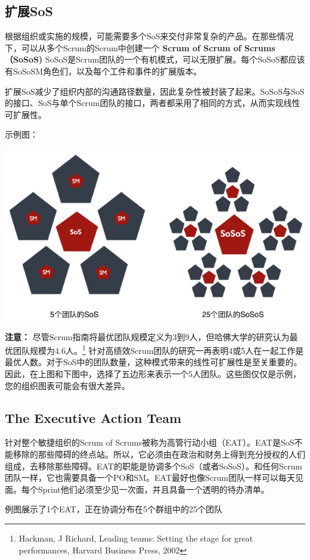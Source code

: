 \documentclass[12pt,a4paper,parskip=full]{scrartcl}
\begin{document}
\begin{CJK*}{UTF8}{gbsn}
\subsection{扩展SoS}
根据组织或实施的规模，可能需要多个SoS来交付非常复杂的产品。在那些情况下，可以从多个Scrum的Scrum中创建一个
\textbf{Scrum of Scrum of Scrums（SoSoS)} SoSoS是Scrum团队的一个有机模式，可以无限扩展。每个SoSoS都应该有SoSoSM角色们，以及每个工件和事件的扩展版本。

扩展SoS减少了组织内部的沟通路径数量，因此复杂性被封装了起来。SoSoS与SoS的接口、SoS与单个Scrum团队的接口，两者都采用了相同的方式，从而实现线性可扩展性。

\pagebreak
示例图：

\includegraphics[width=1.0\linewidth]{Sos-R2.png}

\textbf{\textsc{注意：}} 尽管Scrum指南将最优团队规模定义为3到9人，但哈佛大学的研究认为最优团队规模为4.6人。\footnote{Hackman, J Richard, Leading teams: Setting the stage for
great performances, Harvard Business Press, 2002} 针对高绩效Scrum团队的研究一再表明4或5人在一起工作是最优人数。对于SoS中的团队数量，这种模式带来的线性可扩展性是至关重要的。因此，在上图和下图中，选择了五边形来表示一个5人团队。这些图仅仅是示例，您的组织图表可能会有很大差异。
\subsection{The Executive Action Team}
针对整个敏捷组织的Scrum of Scrums被称为高管行动小组（EAT）。EAT是SoS不能移除的那些障碍的终点站。所以，它必须由在政治和财务上得到充分授权的人们组成，去移除那些障碍。EAT的职能是协调多个SoS（或者SoSoS）。和任何Scrum团队一样，它也需要具备一个PO和SM。EAT最好也像Scrum团队一样可以每天见面。每个Sprint他们必须至少见一次面，并且具备一个透明的待办清单。

\pagebreak
例图展示了1个EAT，正在协调分布在5个群组中的25个团队


\end{CJK*}
\end{document}
